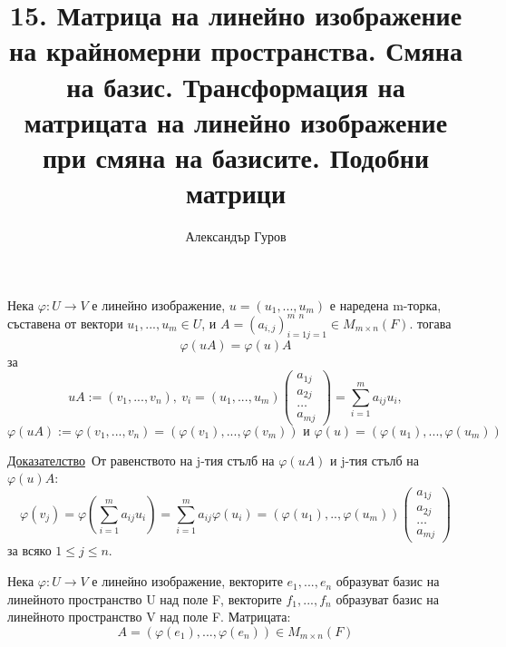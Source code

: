 \documentclass{article}
\title{15. Матрица на линейно изображение на крайномерни пространства. Смяна на базис. 
Трансформация на матрицата на линейно изображение при смяна на базисите. Подобни матрици}
\author{Александър Гуров}
\date{\datebulgarian{\today}}
\newcommand{\dok}{\underline{Доказателство}}
\newcommand{\tvurdenie}[2]{
    \begin{tcolorbox}[title = #1 ,colframe = blue!70!black, colback = blue!10!white]
        #2
    \end{tcolorbox}
}
\newcommand{\opredelenie}[2]{
    \begin{tcolorbox}[title = #1 ,colframe = red!70!black, colback = red!10!white]
        #2
    \end{tcolorbox}
}
\begin{document}
\maketitle

\tvurdenie{Лема 15.2 (\emph{Матричен запис на линейно изображение})}{
Нека $\varphi : U \rightarrow V$ е линейно изображение, $u=(u_1,...,u_m)$ е наредена m-торка, съставена от вектори $u_1,...,u_m\in U$, и
$A=(a_{i,j})_{i=1j=1}^{m \ \ n} \in M_{m\times n}(F)$. тогава
\[
    \varphi(uA)=\varphi(u)A
\]
за
\[
    uA:=(v_1,...,v_n), \ v_i=(u_1,...,u_m)\left(\begin{array}{c}
            a_{1j} \\
            a_{2j} \\
            \dots  \\
            a_{mj}
        \end{array}\right)=\sum_{i=1}^{m}a_{ij}u_i,
\]
\[
    \varphi(uA):=\varphi(v_1,...,v_n)=(\varphi(v_1),...,\varphi(v_m)) \text{ и } \varphi(u)=(\varphi(u_1),...,\varphi(u_m))
\]
}
\dok \ От равенството на j-тия стълб на $\varphi(uA)$ и j-тия стълб на $\varphi(u)A$:
\[
    \varphi(v_j)=\varphi\left(\sum_{i=1}^{m}a_{ij}u_i\right)=\sum_{i=1}^{m}a_{ij}\varphi(u_i)=(\varphi(u_1),..,\varphi(u_m))\left(\begin{array}{c}
            a_{1j} \\
            a_{2j} \\
            \dots  \\
            a_{mj}
        \end{array}\right)
\]
за всяко $1\leq j\leq n$.
\opredelenie{Определение 15.2}{
    Нека $\varphi: U\rightarrow V$ е линейно изображение, векторите $e_1,...,e_n$ образуват базис на
    линейното пространство U над поле F, векторите $f_1,...,f_n$ образуват базис на линейното
    пространство V над поле F. Матрицата:
    \[
        A=(\varphi(e_1),...,\varphi(e_n))\in M_{m\times n}(F)
    \]
}
\end{document}
